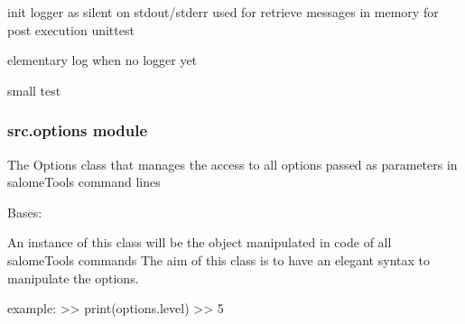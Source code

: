 \documentclass[a4paper,10pt,english]{sphinxmanual}
\begin{document}

\begin{fulllineitems}
\label{\detokenize{apidoc_src/src:src.loggingSat.initLoggerAsUnittest}}
init logger as silent on stdout/stderr
used for retrieve messages in memory for post execution unittest

\end{fulllineitems}


\begin{fulllineitems}
\label{\detokenize{apidoc_src/src:src.loggingSat.log}}
elementary log when no logger yet

\end{fulllineitems}


\begin{fulllineitems}
\label{\detokenize{apidoc_src/src:src.loggingSat.testLogger_1}}
small test

\end{fulllineitems}



\subsubsection{src.options module}
\label{\detokenize{apidoc_src/src:module-src.options}}\label{\detokenize{apidoc_src/src:src-options-module}}
The Options class that manages the access to all options passed as 
parameters in salomeTools command lines

\begin{fulllineitems}
\label{\detokenize{apidoc_src/src:src.options.OptResult}}
Bases: 

An instance of this class will be the object manipulated
in code of all salomeTools commands
The aim of this class is to have an elegant syntax to manipulate the options.

example: 
\textgreater{}\textgreater{} print(options.level)
\textgreater{}\textgreater{} 5

\end{fulllineitems}
\end{document}
